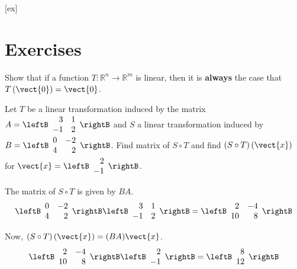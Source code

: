[ex]
\section*{Exercises}

\begin{enumialphparenastyle}

\begin{ex} Show that if a function $T:\mathbb{R}^{n}\rightarrow \mathbb{R}^{m}$
is linear, then it is \textbf{always }the case that $T\left(\vect{0}\right) = \vect{0}$.
\end{ex}

\begin{ex} Let $T$ be a linear transformation induced by the matrix $A = \leftB \begin{array}{rr}
3 & 1 \\
-1 & 2
\end{array}\rightB$ and $S$ a linear transformation induced by $B = \leftB \begin{array}{rr}
0 & -2 \\
4 & 2 
\end{array}\rightB$. Find matrix of $S \circ T$ and find $\left( S \circ T \right) \left( \vect{x} \right)$ for $\vect{x} = \leftB \begin{array}{r}
2 \\
-1 
\end{array} \rightB$. 
\begin{sol}
The matrix of $S \circ T$ is given by $BA$. 
\[
\leftB \begin{array}{rr}
0 & -2 \\
4 & 2 
\end{array}\rightB \leftB \begin{array}{rr}
3 & 1 \\
-1 & 2
\end{array}\rightB = \leftB 
\begin{array}{rr}
2 & -4 \\
10 & 8 
\end{array}
\rightB
\]

Now, $\left( S \circ T \right) \left( \vect{x} \right) = (BA) \vect{x}$. 
\[
 \leftB 
\begin{array}{rr}
2 & -4 \\
10 & 8 
\end{array}
\rightB
\leftB \begin{array}{r}
2 \\
-1 
\end{array} \rightB
= 
\leftB
\begin{array}{r}
8 \\
12
\end{array}
\rightB
\]


\end{sol}
\end{ex}
\end{enumialphparenastyle}
